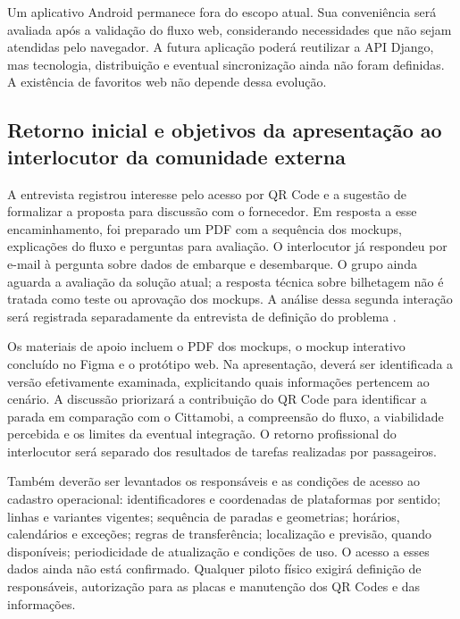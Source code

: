 \documentclass[12pt,oneside,a4paper,brazil]{abntex2}
\begin{document}
Um aplicativo Android permanece fora do escopo atual. Sua conveniência será avaliada após a validação do fluxo web, considerando necessidades que não sejam atendidas pelo navegador. A futura aplicação poderá reutilizar a API Django, mas tecnologia, distribuição e eventual sincronização ainda não foram definidas. A existência de favoritos web não depende dessa evolução.

\subsection{Retorno inicial e objetivos da apresentação ao interlocutor da comunidade externa}
A entrevista registrou interesse pelo acesso por QR Code e a sugestão de formalizar a proposta para discussão com o fornecedor. Em resposta a esse encaminhamento, foi preparado um PDF com a sequência dos mockups, explicações do fluxo e perguntas para avaliação. O interlocutor já respondeu por e-mail à pergunta sobre dados de embarque e desembarque. O grupo ainda aguarda a avaliação da solução atual; a resposta técnica sobre bilhetagem não é tratada como teste ou aprovação dos mockups. A análise dessa segunda interação será registrada separadamente da entrevista de definição do problema \citep[1135--1163 s; 2293--2425 s]{entrevistaosmar2026}.

Os materiais de apoio incluem o PDF dos mockups, o mockup interativo concluído no Figma e o protótipo web. Na apresentação, deverá ser identificada a versão efetivamente examinada, explicitando quais informações pertencem ao cenário. A discussão priorizará a contribuição do QR Code para identificar a parada em comparação com o Cittamobi, a compreensão do fluxo, a viabilidade percebida e os limites da eventual integração. O retorno profissional do interlocutor será separado dos resultados de tarefas realizadas por passageiros.

Também deverão ser levantados os responsáveis e as condições de acesso ao cadastro operacional: identificadores e coordenadas de plataformas por sentido; linhas e variantes vigentes; sequência de paradas e geometrias; horários, calendários e exceções; regras de transferência; localização e previsão, quando disponíveis; periodicidade de atualização e condições de uso. O acesso a esses dados ainda não está confirmado. Qualquer piloto físico exigirá definição de responsáveis, autorização para as placas e manutenção dos QR Codes e das informações.
\end{document}
